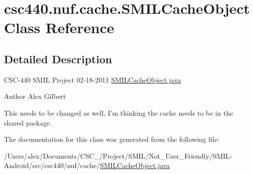 \hypertarget{classcsc440_1_1nuf_1_1cache_1_1_s_m_i_l_cache_object}{\section{csc440.\-nuf.\-cache.\-S\-M\-I\-L\-Cache\-Object Class Reference}
\label{classcsc440_1_1nuf_1_1cache_1_1_s_m_i_l_cache_object}
}


\subsection{Detailed Description}
C\-S\-C-\/440 S\-M\-I\-L Project 02-\/18-\/2011 \hyperlink{_s_m_i_l_cache_object_8java}{S\-M\-I\-L\-Cache\-Object.\-java} \begin{DoxyAuthor}{Author}
Alex Gilbert
\end{DoxyAuthor}
This needs to be changed as well, I'm thinking the cache needs to be in the shared package. 

The documentation for this class was generated from the following file\-:\begin{DoxyCompactItemize}
\item 
/\-Users/alex/\-Documents/\-C\-S\-C\-\_/\-Project/\-S\-M\-I\-L/\-Not\-\_\-\-User\-\_\-\-Friendly/\-S\-M\-I\-L-\/\-Android/src/csc440/nuf/cache/\hyperlink{_s_m_i_l_cache_object_8java}{S\-M\-I\-L\-Cache\-Object.\-java}\end{DoxyCompactItemize}
